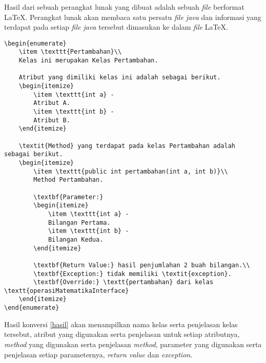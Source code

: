 Hasil dari sebuah perangkat lunak yang dibuat adalah sebuah {\it file} berformat \LaTeX. Perangkat lunak akan membaca satu persatu {\it file java} dan informasi yang terdapat pada setiap {\it file java} tersebut dimasukan ke dalam {\it file} \LaTeX.

\begin{lstlisting}[caption=Contoh hasil konversi {\it Javadoc} ke \LaTeX, label={hasil}]
\begin{enumerate}
	\item \texttt{Pertambahan}\\
	Kelas ini merupakan Kelas Pertambahan.
	
	Atribut yang dimiliki kelas ini adalah sebagai berikut.
	\begin{itemize}
		\item \texttt{int a} -
		Atribut A.
		\item \texttt{int b} -
		Atribut B.
	\end{itemize}
	
	\textit{Method} yang terdapat pada kelas Pertambahan adalah sebagai berikut.
	\begin{itemize}
		\item \texttt{public int pertambahan(int a, int b)}\\
		Method Pertambahan.
		
		\textbf{Parameter:}
		\begin{itemize}
			\item \texttt{int a} - 
			Bilangan Pertama.
			\item \texttt{int b} - 
			Bilangan Kedua.
		\end{itemize}
		
		\textbf{Return Value:} hasil penjumlahan 2 buah bilangan.\\
		\textbf{Exception:} tidak memiliki \textit{exception}.
		\textbf{Override:} \textt{pertambahan} dari kelas \textt{operasiMatematikaInterface}
	\end{itemize}
\end{enumerate}
\end{lstlisting}

Hasil konversi \ref{hasil} akan menampilkan nama kelas serta penjelasan kelas tersebut, atribut yang digunakan serta penjelasan untuk setiap atributnya, {\it method} yang digunakan serta penjelasan {\it method}, parameter yang digunakan serta penjelasan setiap parameternya, {\it return value} dan {\it exception}.

